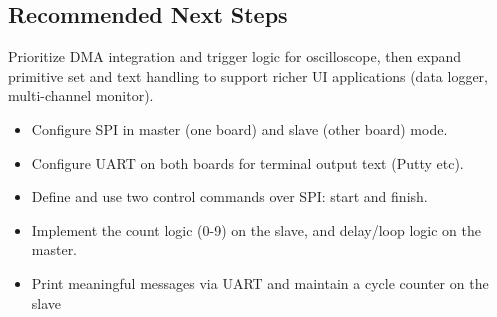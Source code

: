 \documentclass[pdflatex,sn-mathphys-num]{sn-jnl}%
\begin{document}
\subsection{Recommended Next Steps}
Prioritize DMA integration and trigger logic for oscilloscope, then expand primitive set and text handling to support richer UI applications (data logger, multi-channel monitor).

 
\begin{itemize}
\item Configure SPI in master (one board) and slave (other board) mode. 
\item Configure UART on both boards for terminal output text (Putty etc). 
\item Define and use two control commands over SPI: start and finish. 
\item Implement the count logic (0-9) on the slave, and delay/loop logic on the master. 
\item Print meaningful messages via UART and maintain a cycle counter on the slave

  \end{itemize}
% 
\end{document}
